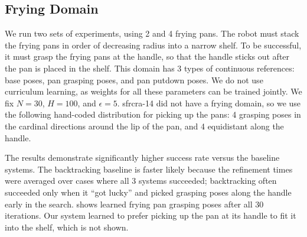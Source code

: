
\subsection{Frying Domain}
We run two sets of experiments, using 2 and 4 frying pans. The robot must stack the frying pans in order of decreasing
radius into a narrow shelf. To be successful, it must grasp the frying pans at the handle, so that the handle sticks out
after the pan is placed in the shelf. This domain has 3 types of continuous references: base poses, pan grasping poses, and
pan putdown poses. We do not use curriculum learning, as weights for all these parameters can be trained jointly.
We fix $N = 30$, $H = 100$, and $\epsilon = 5$. {\sc sfrcra-14} did not have a frying domain, so we use the following
hand-coded distribution for picking up the pans: 4 grasping poses in the cardinal directions around the lip of the pan,
and 4 equidistant along the handle.

The results demonstrate significantly higher success rate versus the baseline systems. The backtracking baseline is faster likely because
the refinement times were averaged over cases where all 3 systems succeeded; backtracking often succeeded only when
it ``got lucky'' and picked grasping poses along the handle early in the search.  shows learned frying pan
grasping poses after all 30 iterations. Our system learned to prefer picking up the pan at its handle to fit it into the shelf, which is not shown.
